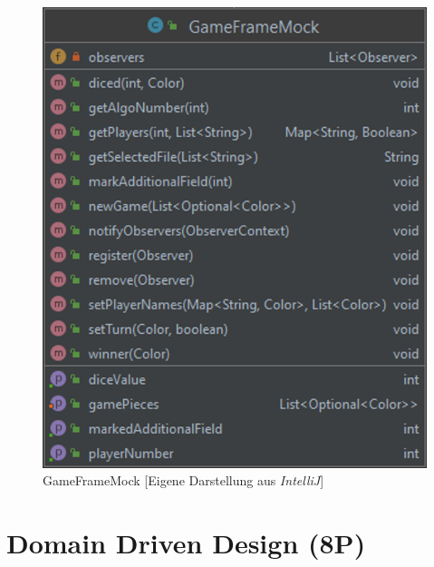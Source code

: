 \begin{figure}[htbp]
\centering
\centerline{\includegraphics[scale=.5]{gameframemock}}
\caption{GameFrameMock [Eigene Darstellung aus \emph{IntelliJ}]}
\label{fig:gameframemock}
\end{figure}

\newpage
\titlespacing*{\chapter}{0pt}{-30mm}{10pt}
  
\chapter{Domain Driven Design (8P)}
\pagestyle{scrheadings}
\clearscrheadfoot
{}
\setcounter{page}{27}
\ofoot[\pagemark]{\pagemark}
\onehalfspacing

